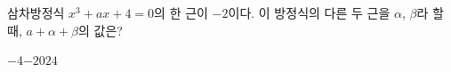 삼차방정식 $x^3+ax+4=0$의 한 근이 $-2$이다. 이 방정식의 다른 두 근을 $\alpha$, $\beta$라 할 때, $a+\alpha+\beta$의 값은? 
\begin{choices32}{$-4$}{$-2$}{$0$}{$2$}{$4$}\end{choices32}
